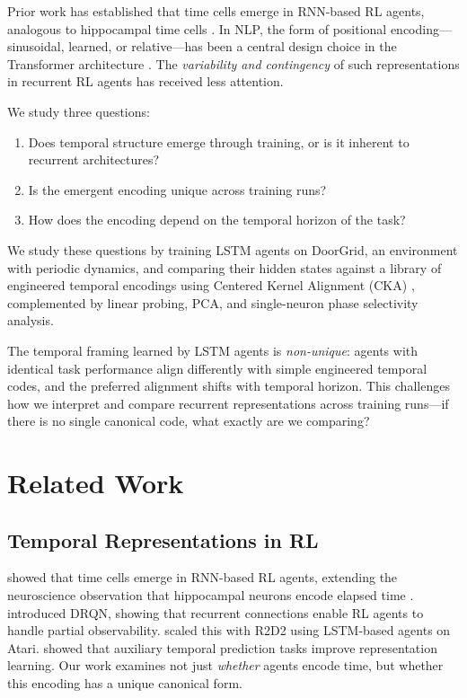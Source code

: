 \documentclass{article}
\begin{document}
Prior work has established that time cells emerge in RNN-based RL agents, analogous to hippocampal time cells \citep{macdonald2011hippocampal,lin2023timecells}.
In NLP, the form of positional encoding---sinusoidal, learned, or relative---has been a central design choice in the Transformer architecture \citep{vaswani2017attention}.
The \emph{variability and contingency} of such representations in recurrent RL agents has received less attention.

We study three questions:
\begin{enumerate}
\setlength{\itemsep}{0pt}
\item[(Q1)] Does temporal structure emerge through training, or is it inherent to recurrent architectures?
\item[(Q2)] Is the emergent encoding unique across training runs?
\item[(Q3)] How does the encoding depend on the temporal horizon of the task?
\end{enumerate}

We study these questions by training LSTM agents on DoorGrid, an environment with periodic dynamics, and comparing their hidden states against a library of engineered temporal encodings using Centered Kernel Alignment (CKA) \citep{kornblith2019cka}, complemented by linear probing, PCA, and single-neuron phase selectivity analysis.

The temporal framing learned by LSTM agents is \emph{non-unique}: agents with identical task performance align differently with simple engineered temporal codes, and the preferred alignment shifts with temporal horizon.
This challenges how we interpret and compare recurrent representations across training runs---if there is no single canonical code, what exactly are we comparing?

\section{Related Work}

\subsection{Temporal Representations in RL}

\citet{lin2023timecells} showed that time cells emerge in RNN-based RL agents, extending the neuroscience observation that hippocampal neurons encode elapsed time \citep{macdonald2011hippocampal}.
\citet{hausknecht2015drqn} introduced DRQN, showing that recurrent connections enable RL agents to handle partial observability.
\citet{kapturowski2019r2d2} scaled this with R2D2 using LSTM-based agents on Atari.
\citet{jaderberg2017aux} showed that auxiliary temporal prediction tasks improve representation learning.
Our work examines not just \emph{whether} agents encode time, but whether this encoding has a unique canonical form.
\end{document}
